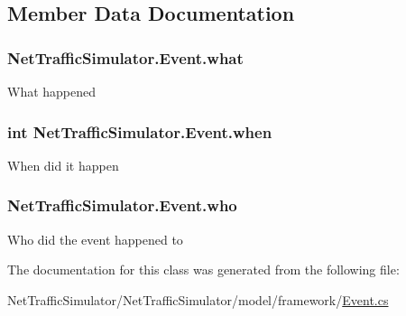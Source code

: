 \subsection{Member Data Documentation}
\hypertarget{classNetTrafficSimulator_1_1Event_ababdb18d23b8e6ccad9a6dbe01501c42}{
\subsubsection[{what}]{ Net\-Traffic\-Simulator.\-Event.\-what}}\label{classNetTrafficSimulator_1_1Event_ababdb18d23b8e6ccad9a6dbe01501c42}
What happened \hypertarget{classNetTrafficSimulator_1_1Event_a6e2cc07d321e15875f0f254246c4369c}{
\subsubsection[{when}]{\setlength{\rightskip}{0pt plus 5cm}int Net\-Traffic\-Simulator.\-Event.\-when}}\label{classNetTrafficSimulator_1_1Event_a6e2cc07d321e15875f0f254246c4369c}
When did it happen \hypertarget{classNetTrafficSimulator_1_1Event_a2bf4854e94376c4577643120a3a92d96}{
\subsubsection[{who}]{ Net\-Traffic\-Simulator.\-Event.\-who}}\label{classNetTrafficSimulator_1_1Event_a2bf4854e94376c4577643120a3a92d96}
Who did the event happened to 

The documentation for this class was generated from the following file\-:\begin{DoxyCompactItemize}
\item 
Net\-Traffic\-Simulator/\-Net\-Traffic\-Simulator/model/framework/\hyperlink{Event_8cs}{Event.\-cs}\end{DoxyCompactItemize}
